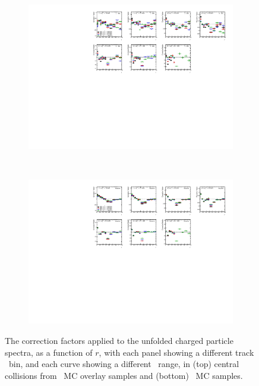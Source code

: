 \begin{figure}
\centering
\begin{subfigure}{1.\textwidth}
\centering \includegraphics[page=1, width=1\textwidth]{figures/main/corrections/RatioProj_PbPb}
\caption{}
\label{fig:pos_corr_factors_PbPb_c0}
\end{subfigure} \\
\begin{subfigure}{1.\textwidth}
\centering \includegraphics[page=1, width=1\textwidth]{figures/main/corrections/RatioProj_pp}
\caption{}
\label{fig:pos_corr_factors_pp}
\end{subfigure}
\caption{The correction factors applied to the unfolded charged particle spectra, as a function of $r$, with each panel showing a different track \pt\ bin, and each curve showing a different \ptjet\ range, in (top) central collisions from \pbpb\ MC overlay samples and (bottom) \pp\ MC samples.} 
\label{fig:pos_corr_factors}
\end{figure}


